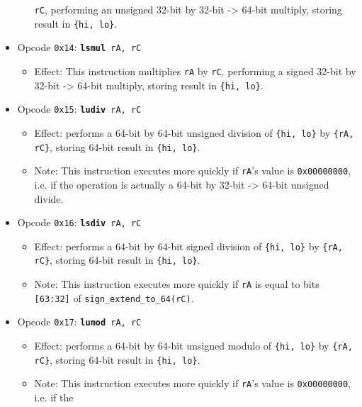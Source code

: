 \documentclass{article}
\begin{document}
\begin{itemize}
\begin{itemize}
			\texttt{rC}, performing an unsigned 32-bit by 32-bit -> 64-bit
			multiply, storing result in \texttt{\{hi, lo\}}.
		\end{itemize}
		\item Opcode \texttt{0x14}:
			\texttt{\textbf{lsmul} rA, rC}
		\begin{itemize}
			\item Effect:  This instruction multiplies \texttt{rA} by
			\texttt{rC}, performing a signed 32-bit by 32-bit -> 64-bit
			multiply, storing result in \texttt{\{hi, lo\}}.
		\end{itemize}
		\item Opcode \texttt{0x15}:
			\texttt{\textbf{ludiv} rA, rC}
		\begin{itemize}
			\item Effect:  performs a 64-bit by 64-bit unsigned division of
			\texttt{\{hi, lo\}} by \texttt{\{rA, rC\}}, storing 64-bit
			result in \texttt{\{hi, lo\}}.
			\item Note:  This instruction executes more quickly if
			\texttt{rA}'s value is \texttt{0x00000000}, i.e. if the
			operation is actually a 64-bit by 32-bit -> 64-bit unsigned
			divide.
		\end{itemize}
		\item Opcode \texttt{0x16}:
			\texttt{\textbf{lsdiv} rA, rC}
		\begin{itemize}
			\item Effect:  performs a 64-bit by 64-bit signed division of
			\texttt{\{hi, lo\}} by \texttt{\{rA, rC\}}, storing 64-bit
			result in \texttt{\{hi, lo\}}.
			\item Note:  This instruction executes more quickly if
			\texttt{rA} is equal to bits \texttt{[63:32]} of
			\texttt{sign\_extend\_to\_64(rC)}.
		\end{itemize}
		\item Opcode \texttt{0x17}:
			\texttt{\textbf{lumod} rA, rC}
		\begin{itemize}
			\item Effect:  performs a 64-bit by 64-bit unsigned modulo of
			\texttt{\{hi, lo\}} by \texttt{\{rA, rC\}}, storing 64-bit
			result in \texttt{\{hi, lo\}}.
			\item Note:  This instruction executes more quickly if
			\texttt{rA}'s value is \texttt{0x00000000}, i.e. if the

\end{itemize}
\end{itemize}
\end{document}
